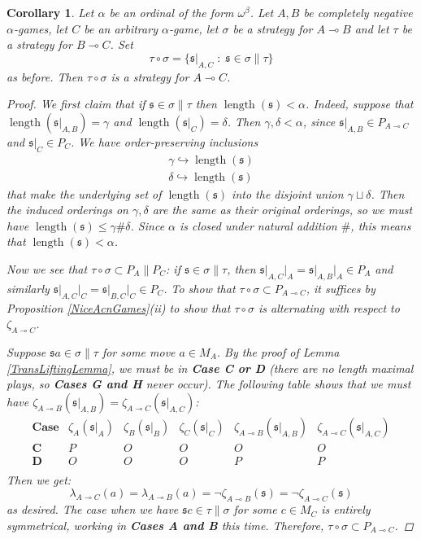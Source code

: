 \documentclass[11pt]{article} %
\theoremstyle{plain} %
\newtheorem{corollary}[theorem]{Corollary}
\theoremstyle{definition} %
\theoremstyle{note}
\theoremstyle{exercisestyle}
\renewcommand{\implies}{\multimap}
\newcommand{\comp}[2]{#1 \circ #2}
\newcommand{\suchthat}{\;\colon\;}
\newcommand{\s}{\mathfrak s}
\DeclareMathOperator{\length}{length}
\begin{document}
\begin{corollary}
  Let $\alpha$ be an ordinal of the form $\omega^{\beta}$.  Let $A,B$ be completely negative $\alpha$-games, let $C$ be an arbitrary $\alpha$-game, let $\sigma$ be a strategy for $A\implies B$ and let $\tau$ be a strategy for $B\implies C$.  Set
  \[
    \comp\tau\sigma = \{\s\vert_{A,C}\suchthat\s\in\sigma\|\tau\}
    \]
  as before.  Then $\comp\tau\sigma$ is a strategy for $A\implies C$.

  \begin{proof}
    We first claim that if $\s\in\sigma\|\tau$ then $\length(\s)<\alpha$.  Indeed, suppose that $\length(\s\vert_{A,B})=\gamma$ and $\length(\s\vert_C)=\delta$.  Then $\gamma,\delta<\alpha$, since $\s\vert_{A,B}\in P_{A\implies C}$ and $\s\vert_C\in P_C$.  We have order-preserving inclusions
    \begin{gather*}
      \gamma\hookrightarrow\length(\s)\\
      \delta\hookrightarrow\length(\s)
    \end{gather*}
    that make the underlying set of $\length(\s)$ into the disjoint union $\gamma\sqcup\delta$.  Then the induced orderings on $\gamma,\delta$ are the same as their original orderings, so we must have $\length(\s)\le\gamma\#\delta$.  Since $\alpha$ is closed under natural addition $\#$, this means that $\length(\s)<\alpha$.  

    Now we see that $\comp\tau\sigma\subset P_A\|P_C$: if $\s\in\sigma\|\tau$, then $\s\vert_{A,C}\vert_A=\s\vert_{A,B}\vert_A\in P_A$ and similarly $\s\vert_{A,C}\vert_C=\s\vert_{B,C}\vert_C\in P_C$.  To show that $\comp\tau\sigma\subset P_{A\implies C}$, it suffices by Proposition \ref{NiceAcnGames}(ii) to show that $\comp\tau\sigma$ is alternating with respect to $\zeta_{A\implies C}$.

    Suppose $\s a\in\sigma\|\tau$ for some move $a\in M_A$.  By the proof of Lemma \ref{TransLiftingLemma}, we must be in \textbf{Case C or D} (there are no length maximal plays, so \textbf{Cases G and H} never occur).  The following table shows that we must have $\zeta_{A\implies B}(\s\vert_{A,B})=\zeta_{A\implies C}(\s\vert_{A,C})$:
    \[
      \begin{array}{c|ccc|cc}
        \textbf{Case} & \zeta_A(\s\vert_A) & \zeta_B(\s\vert_B) & \zeta_C(\s\vert_C) & \zeta_{A\implies B}(\s\vert_{A,B}) & \zeta_{A\implies C}(\s\vert_{A,C}) \\
        \hline
        \textbf{C} & P & O & O & O & O \\
        \textbf{D} & O & O & O & P & P \\
      \end{array}
      \]
    Then we get:
    \[
      \lambda_{A\implies C}(a) = \lambda_{A\implies B}(a) = \neg\zeta_{A\implies B}(\s) = \neg\zeta_{A\implies C}(\s)
      \]
    as desired.  The case when we have $\s c\in\tau\|\sigma$ for some $c\in M_C$ is entirely symmetrical, working in \textbf{Cases A and B} this time.  Therefore, $\comp\tau\sigma\subset P_{A\implies C}$.  


\end{proof}
\end{corollary}
\end{document}
